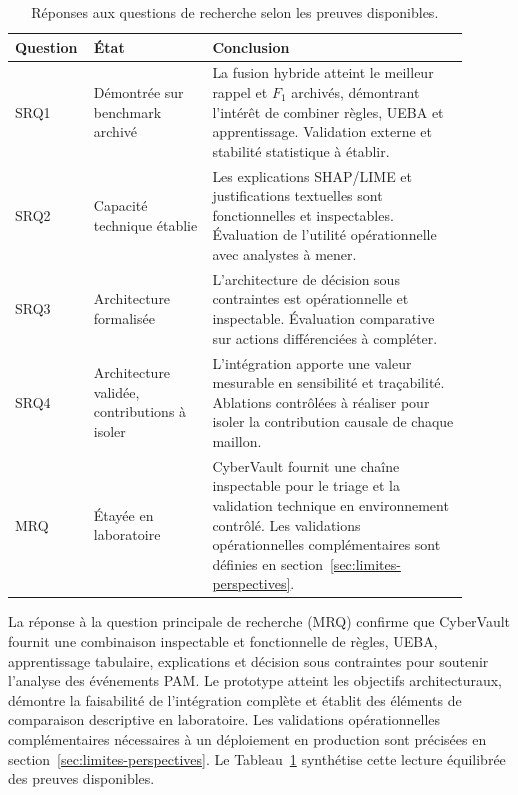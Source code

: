 \documentclass[11pt,a4paper,oneside]{report}
\theoremstyle{definition}
\theoremstyle{plain}
\begin{document}
\begin{table}[tb]
  \centering
  \caption{Réponses aux questions de recherche selon les preuves disponibles.}
  \label{tab:disc-rq-summary}
  \small
  \begin{tabular}{@{}p{0.11\linewidth}p{0.25\linewidth}p{0.54\linewidth}@{}}
    \toprule
    Question & État & Conclusion \\
    \midrule
    SRQ1 & Démontrée sur benchmark archivé &
      La fusion hybride atteint le meilleur rappel et \(F_1\) archivés, démontrant l'intérêt de combiner règles, UEBA et apprentissage. Validation externe et stabilité statistique à établir. \\
    SRQ2 & Capacité technique établie &
      Les explications SHAP/LIME et justifications textuelles sont fonctionnelles et inspectables. Évaluation de l'utilité opérationnelle avec analystes à mener. \\
    SRQ3 & Architecture formalisée &
      L'architecture de décision sous contraintes est opérationnelle et inspectable. Évaluation comparative sur actions différenciées à compléter. \\
    SRQ4 & Architecture validée, contributions à isoler &
      L'intégration apporte une valeur mesurable en sensibilité et traçabilité. Ablations contrôlées à réaliser pour isoler la contribution causale de chaque maillon. \\
    MRQ & Étayée en laboratoire &
      CyberVault fournit une chaîne inspectable pour le triage et la validation
      technique en environnement contrôlé. Les validations opérationnelles
      complémentaires sont définies en section~\ref{sec:limites-perspectives}. \\
    \bottomrule
  \end{tabular}
\end{table}

La réponse à la question principale de recherche (MRQ) confirme que CyberVault fournit une combinaison inspectable et fonctionnelle de règles, UEBA, apprentissage tabulaire, explications et décision sous contraintes pour soutenir l'analyse des événements PAM. Le prototype atteint les objectifs architecturaux, démontre la faisabilité de l'intégration complète et établit des éléments de comparaison descriptive en laboratoire. Les validations opérationnelles complémentaires nécessaires à un déploiement en production sont précisées en section~\ref{sec:limites-perspectives}. Le Tableau~\ref{tab:disc-rq-summary} synthétise cette lecture équilibrée des preuves disponibles.
\end{document}
